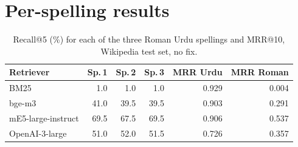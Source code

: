 \section{Per-spelling results}
\label{app:spellings}
\begin{table}[h]\centering\small\setlength{\tabcolsep}{3pt}
\begin{tabular}{lrrrrr}\toprule
Retriever & Sp.\,1 & Sp.\,2 & Sp.\,3 & MRR Urdu & MRR Roman \\
\midrule
BM25 & 1.0 & 1.0 & 1.0 & 0.929 & 0.004 \\
bge-m3 & 41.0 & 39.5 & 39.5 & 0.903 & 0.291 \\
mE5-large-instruct & 69.5 & 67.5 & 69.5 & 0.906 & 0.537 \\
OpenAI-3-large & 51.0 & 52.0 & 51.5 & 0.726 & 0.357 \\
\bottomrule\end{tabular}
\caption{Recall@5 (\%) for each of the three Roman Urdu spellings and MRR@10, Wikipedia test set, no fix.}
\end{table}
